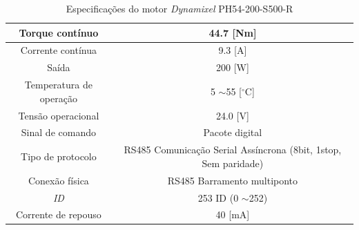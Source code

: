 \documentclass[
12pt,					%
openright,				%
twoside,				%
a4paper,				%
english,
brazil
]{ABNT/abntex2_report}
\begin{document}
\begin{table}[H]
\begin{adjustbox}{max width=\textwidth}
\begin{tabular}{|c|c|}
		\rowcolor[HTML]{FFFFFF} 
		{\color[HTML]{000000} Torque contínuo}                                             & {\color[HTML]{000000} 44.7 {[}Nm{]}}                                                   \\ \hline
		\rowcolor[HTML]{EFEFEF} 
		{\color[HTML]{000000} Corrente contínua}                                           & {\color[HTML]{000000} 9.3 {[}A{]}}                                                     \\ \hline
		\rowcolor[HTML]{FFFFFF} 
		{\color[HTML]{000000} Saída}                                                       & {\color[HTML]{000000} 200 {[}W{]}}                                                     \\ \hline
		\rowcolor[HTML]{EFEFEF} 
		{\color[HTML]{000000} Temperatura de operação}                                     & {\color[HTML]{000000} 5 $\sim$55 {[}$^\circ$C{]}}                                      \\ \hline
		\rowcolor[HTML]{FFFFFF} 
		{\color[HTML]{000000} Tensão operacional}                                          & {\color[HTML]{000000} 24.0 {[}V{]}}                                                    \\ \hline
		\rowcolor[HTML]{EFEFEF} 
		{\color[HTML]{000000} Sinal de comando}                                            & {\color[HTML]{000000} Pacote digital}                                                  \\ \hline
		\rowcolor[HTML]{FFFFFF} 
		{\color[HTML]{000000} Tipo de protocolo}                                           & {\color[HTML]{000000} RS485 Comunicação Serial Assíncrona (8bit, 1stop, Sem paridade)} \\ \hline
		\rowcolor[HTML]{EFEFEF} 
		{\color[HTML]{000000} Conexão física}                                              & {\color[HTML]{000000} RS485 Barramento multiponto}                                     \\ \hline
		\rowcolor[HTML]{FFFFFF} 
		{\color[HTML]{000000} \textit{ID}}                                                 & {\color[HTML]{000000} 253 ID (0 $\sim$252)}                                            \\ \hline
		\rowcolor[HTML]{EFEFEF} 
		{\color[HTML]{000000} Corrente de repouso}                                         & {\color[HTML]{000000} 40 {[}mA{]}}                                                     \\ \hline
		\end{tabular}
		\end{adjustbox}
		\caption{Especificações do motor \textit{Dynamixel} PH54-200-S500-R}
	\end{table}


	


	
\end{document}
